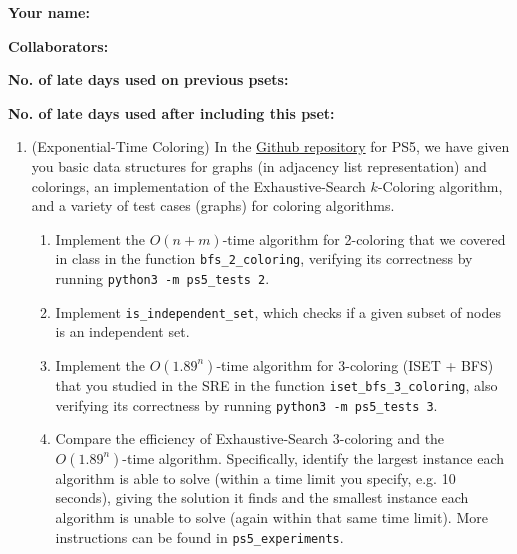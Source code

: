 \documentclass[11pt]{article}
\begin{document}

\textbf{Your name: }

\textbf{Collaborators: }

\textbf{No. of late days used on previous psets: }

\textbf{No. of late days used after including this pset: }

\begin{enumerate}
 
 \item (Exponential-Time Coloring) 
  In the \href{https://github.com/Harvard-CS-120/cs120/tree/main/fall2022/psets}{Github repository} for PS5, we have given you basic data structures for graphs (in adjacency list representation) and colorings, an implementation of the Exhaustive-Search $k$-Coloring algorithm, and a variety of test cases (graphs) for coloring algorithms.

  \begin{enumerate}
      \item Implement the $O(n+m)$-time algorithm for 2-coloring that we covered in class in the function \texttt{bfs\_2\_coloring}, verifying its correctness by running \texttt{python3 -m ps5\_tests 2}.
      
      \item Implement \texttt{is\_independent\_set}, which checks if a given subset of nodes is an independent set.
      
      \item Implement the $O(1.89^n)$-time algorithm for 3-coloring (ISET + BFS) that you studied in the SRE in the function \texttt{iset\_bfs\_3\_coloring}, also verifying its correctness by running \texttt{python3 -m ps5\_tests 3}. \label{part:TbT}
      
      \item Compare the efficiency of Exhaustive-Search 3-coloring and the $O(1.89^n)$-time algorithm. Specifically, identify the largest instance each algorithm is able to solve (within a time limit you specify, e.g. 10 seconds), giving the solution it finds and the smallest instance each algorithm is unable to solve (again within that same time limit). More instructions can be found in \texttt{ps5\_experiments}.
      
  \end{enumerate}


\end{enumerate}
\end{document}
